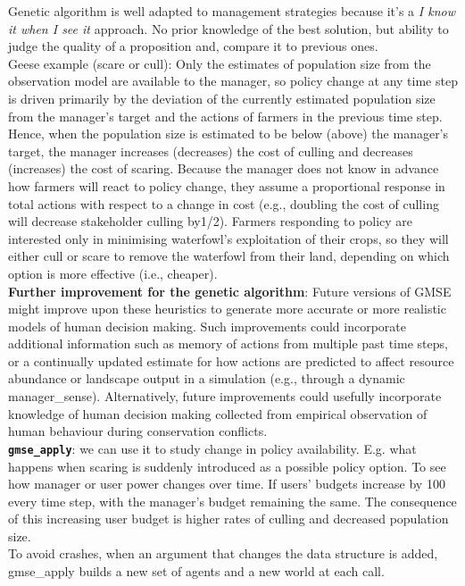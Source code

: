 \documentclass[12pt]{article}
\begin{document}
Genetic algorithm is well adapted to management strategies because it's a \textit{I know it when I see it} approach. No prior knowledge of the best solution, but ability to judge the quality of a proposition and, compare it to previous ones.\\

Geese example (scare or cull): Only the estimates of population size from the observation model are available to the manager, so policy change at any time step is driven primarily by the deviation of the currently estimated population size from the manager’s target and the actions of farmers in the previous time step. Hence, when the population size is estimated to be below (above) the manager’s target, the manager increases (decreases) the cost of culling and decreases (increases) the cost of scaring. Because the manager does not know in advance how farmers will react to policy change, they assume a proportional response in total actions with respect to a change in cost (e.g., doubling the cost of culling will decrease stakeholder culling by1/2). Farmers responding to policy are interested only in minimising waterfowl’s exploitation of their crops, so they will either cull or scare to remove the waterfowl from their land, depending on which option is more effective (i.e., cheaper).\\

\textbf{Further improvement for the genetic algorithm}: Future  versions  of  GMSE  might  improve upon  these  heuristics  to  generate  more  accurate  or  more  realistic  models  of  human  decision  making.  Such improvements  could  incorporate  additional  information  such  as  memory  of  actions  from  multiple  past  time steps,  or  a  continually  updated  estimate  for  how  actions  are  predicted  to  affect  resource  abundance  or  landscape output  in  a  simulation  (e.g.,  through  a  dynamic manager\_sense).  Alternatively,  future  improvements  could usefully  incorporate  knowledge  of  human  decision  making  collected  from  empirical  observation  of  human behaviour  during  conservation  conflicts.\\  

\textbf{\texttt{gmse\_apply}}: we  can  use  it  to  study  change  in  policy  availability. E.g.  what  happens when  scaring  is  suddenly  introduced  as  a  possible  policy  option. To see  how  manager  or  user  power  changes  over  time.  If  users’  budgets  increase  by  100 every  time  step,  with  the  manager’s  budget  remaining  the  same.  The  consequence  of  this  increasing  user budget  is  higher  rates  of  culling  and  decreased  population  size.\\
To avoid crashes, when an argument that changes the data structure is added, gmse\_apply builds a new set of agents and a new world at each call.\\
\end{document}
